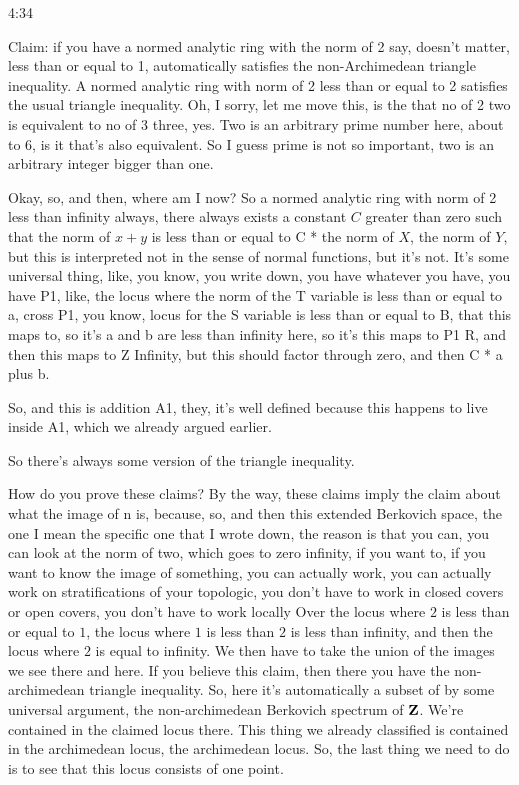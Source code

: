 \begin{unfinished}{4:34}
\begin{example}
\begin{example}
\begin{example}
Claim: if you have a normed analytic ring with the norm of 2 say, doesn't matter, less than or equal to 1, automatically satisfies the non-Archimedean triangle inequality. A normed analytic ring with norm of 2 less than or equal to 2 satisfies the usual triangle inequality. Oh, I sorry, let me move this, is the that no of 2 two is equivalent to no of 3 three, yes. Two is an arbitrary prime number here, about to 6, is it that's also equivalent. So I guess prime is not so important, two is an arbitrary integer bigger than one.

Okay, so, and then, where am I now? So a normed analytic ring with norm of 2 less than infinity always, there always exists a constant $C$ greater than zero such that the norm of $x + y$ is less than or equal to C * the norm of $X$, the norm of $Y$, but this is interpreted not in the sense of normal functions, but it's not. It's some universal thing, like, you know, you write down, you have whatever you have, you have P1, like, the locus where the norm of the T variable is less than or equal to a, cross P1, you know, locus for the S variable is less than or equal to B, that this maps to, so it's a and b are less than infinity here, so it's this maps to P1 R, and then this maps to Z Infinity, but this should factor through zero, and then C * a plus b.

So, and this is addition A1, they, it's well defined because this happens to live inside A1, which we already argued earlier.

So there's always some version of the triangle inequality.

How do you prove these claims? By the way, these claims imply the claim about what the image of n is, because, so, and then this extended Berkovich space, the one I mean the specific one that I wrote down, the reason is that you can, you can look at the norm of two, which goes to zero infinity, if you want to, if you want to know the image of something, you can actually work, you can actually work on stratifications of your topologic, you don't have to work in closed covers or open covers, you don't have to work locally
Over the locus where $2$ is less than or equal to $1$, the locus where $1$ is less than $2$ is less than infinity, and then the locus where $2$ is equal to infinity. We then have to take the union of the images we see there and here. If you believe this claim, then there you have the non-archimedean triangle inequality. So, here it's automatically a subset of by some universal argument, the non-archimedean Berkovich spectrum of $\mathbf Z$. We're contained in the claimed locus there. This thing we already classified is contained in the archimedean locus, the archimedean locus. So, the last thing we need to do is to see that this locus consists of one point.


\end{example}
\end{example}
\end{example}
\end{unfinished}
